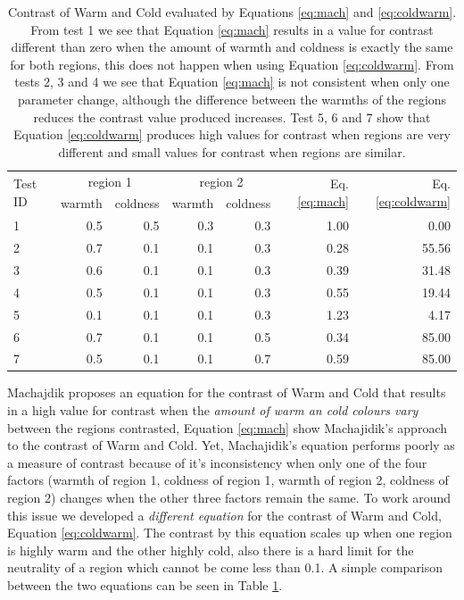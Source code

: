 \documentclass[11pt,a4paper,twoside,openright,draft]{report}
\begin{document}
\begin{multicols}{2}
\begin{table}[pht]  %
\centering
{}
\begin{tabular}{l|r|r|r|r|r|r}
\toprule
\multirow{2}{*}{Test ID}
  & \multicolumn{2}{c}{region 1}
  & \multicolumn{2}{c}{region 2}
  & \multirow{2}{*}{Eq. \ref{eq:mach}}
  & \multirow{2}{*}{Eq. \ref{eq:coldwarm}}
  \\
\cline{2-5}
& warmth & coldness & warmth & coldness \\
\midrule
1 & 0.5 & 0.5 & 0.3 & 0.3 & 1.00 & 0.00  \\
2 & 0.7 & 0.1 & 0.1 & 0.3 & 0.28 & 55.56 \\
3 & 0.6 & 0.1 & 0.1 & 0.3 & 0.39 & 31.48 \\
4 & 0.5 & 0.1 & 0.1 & 0.3 & 0.55 & 19.44 \\
5 & 0.1 & 0.1 & 0.1 & 0.3 & 1.23 & 4.17  \\
6 & 0.7 & 0.1 & 0.1 & 0.5 & 0.34 & 85.00 \\
7 & 0.5 & 0.1 & 0.1 & 0.7 & 0.59 & 85.00 \\
\bottomrule
\end{tabular}
\caption[Contrast of Warm and Cold]{Contrast of Warm and Cold evaluated by
Equations \ref{eq:mach} and \ref{eq:coldwarm}.  From test 1 we see that
Equation \ref{eq:mach} results in a value for contrast different than zero when
the amount of warmth and coldness is exactly the same for both regions, this
does not happen when using Equation \ref{eq:coldwarm}.  From tests 2, 3 and 4
we see that Equation \ref{eq:mach} is not consistent when only one parameter
change, although the difference between the warmths of the regions reduces the
contrast value produced increases.  Test 5, 6 and 7 show that Equation
\ref{eq:coldwarm} produces high values for contrast when regions are very
different and small values for contrast when regions are similar.}
\label{tab:cweq}
\end{table}

Machajdik \cite{mach10clas} proposes an equation for the contrast of Warm and
Cold that results in a high value for contrast when the \emph{amount of warm an
cold colours vary} between the regions contrasted, Equation \ref{eq:mach} show
Machajidik's approach to the contrast of Warm and Cold.  Yet, Machajidik's
equation performs poorly as a measure of contrast because of it's inconsistency
when only one of the four factors (warmth of region 1, coldness of region 1,
warmth of region 2, coldness of region 2) changes when the other three factors
remain the same.  To work around this issue we developed a \emph{different
equation} for the contrast of Warm and Cold, Equation \ref{eq:coldwarm}.  The
contrast by this equation scales up when one region is highly warm and the
other highly cold, also there is a hard limit for the neutrality of a region
which cannot be come less than 0.1.  A simple comparison between the two
equations can be seen in Table \ref{tab:cweq}.


\end{multicols}
\end{document}
